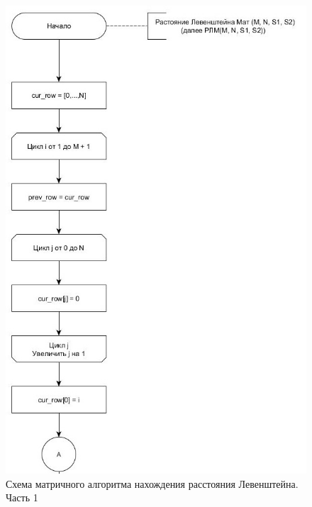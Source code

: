 \documentclass[14pt,russian]{scrartcl}
\begin{document}
\begin{figure}[h]
	\centering
	\includegraphics[scale=0.9]{matr_lev11.jpg}
	\caption{Схема матричного алгоритма нахождения расстояния Левенштейна. Часть 1}
	\label{fig:iter_lev}
\end{figure}
\end{document}
